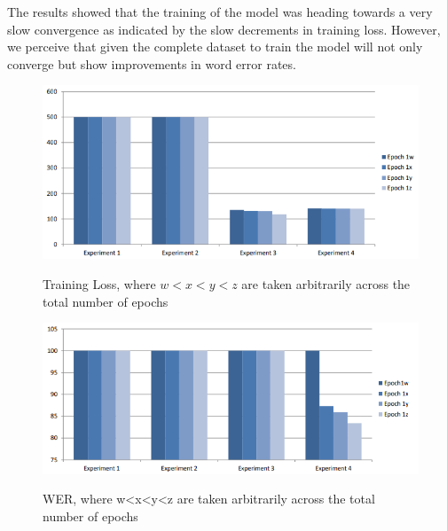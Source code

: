The results showed that the training of the model was heading towards a very slow convergence as indicated by the slow decrements in training loss.  However, we perceive that given the complete dataset to train the model will not only converge but show improvements in word error rates.
\begin{figure}
\centering
  \includegraphics[width=14cm]{thesis/images/res00.PNG}\\
  \caption{Training Loss, where $w<x<y<z$ are taken arbitrarily across the
total number of epochs} \label{fig_6_2_loss}
\end{figure}
\begin{figure}
\centering
  \includegraphics[width=14cm]{thesis/images/res01.PNG}\\
  \caption{WER, where w<x<y<z are taken arbitrarily across the total
number of epochs} \label{fig_6_3_wer}
\end{figure}

